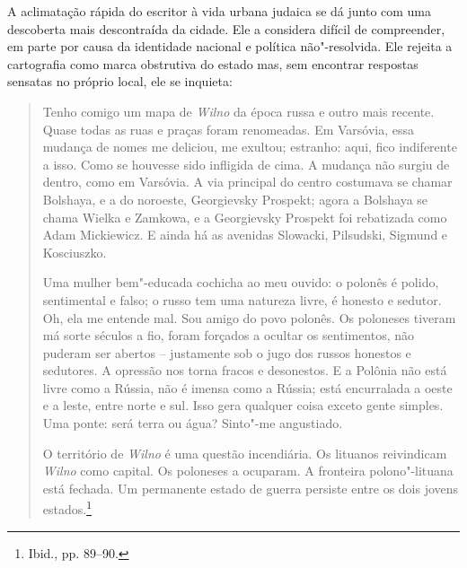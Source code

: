 A aclimatação rápida do escritor à vida urbana judaica se dá junto com
uma descoberta mais descontraída da cidade. Ele a considera difícil de
compreender, em parte por causa da identidade nacional e política
não"-resolvida. Ele rejeita a cartografia como marca obstrutiva do estado
mas, sem encontrar respostas sensatas no próprio local, ele se inquieta:

\begin{quote}
Tenho comigo um mapa de \textit{Wilno} da época russa e outro mais recente. Quase
todas as ruas e praças foram renomeadas. Em Varsóvia, essa mudança de
nomes me deliciou, me exultou; estranho: aqui, fico indiferente a isso.
Como se houvesse sido infligida de cima. A mudança não surgiu de dentro,
como em Varsóvia. A via principal do centro costumava se chamar
Bolshaya, e a do noroeste, Georgievsky Prospekt; agora a Bolshaya se
chama Wielka e Zamkowa, e a Georgievsky Prospekt foi rebatizada como
Adam Mickiewicz. E ainda há as avenidas Slowacki, Pilsudski, Sigmund e
Kosciuszko.

Uma mulher bem"-educada cochicha ao meu ouvido: o polonês é polido,
sentimental e falso; o russo tem uma natureza livre, é honesto e
sedutor. Oh, ela me entende mal. Sou amigo do povo polonês. Os poloneses
tiveram má sorte séculos a fio, foram forçados a ocultar os sentimentos,
não puderam ser abertos -- justamente sob o jugo dos russos honestos e
sedutores. A opressão nos torna fracos e desonestos. E a Polônia não
está livre como a Rússia, não é imensa como a Rússia; está encurralada a
oeste e a leste, entre norte e sul. Isso gera qualquer coisa exceto
gente simples. Uma ponte: será terra ou água? Sinto"-me angustiado.

O território de \textit{Wilno} é uma questão incendiária. Os lituanos reivindicam
\textit{Wilno} como capital. Os poloneses a ocuparam. A fronteira polono"-lituana
está fechada. Um permanente estado de guerra persiste entre os dois
jovens estados.\footnote{Ibid., pp. 89--90.}
\end{quote}

